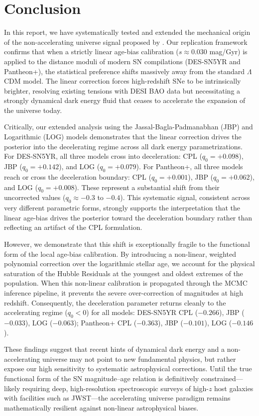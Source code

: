 \documentclass[12pt, a4paper]{article}
\begin{document}
\section{Conclusion}
In this report, we have systematically tested and extended the mechanical origin of the non-accelerating universe signal proposed by \citet{son2025}. Our replication framework confirms that when a strictly linear age-bias calibration ($s \approx 0.030$ mag/Gyr) is applied to the distance moduli of modern SN compilations (DES-SN5YR and Pantheon+), the statistical preference shifts massively away from the standard $\Lambda$CDM model. The linear correction forces high-redshift SNe to be intrinsically brighter, resolving existing tensions with DESI BAO data but necessitating a strongly dynamical dark energy fluid that ceases to accelerate the expansion of the universe today.

Critically, our extended analysis using the Jassal-Bagla-Padmanabhan (JBP) and Logarithmic (LOG) models demonstrates that the linear correction drives the posterior into the decelerating regime across all dark energy parametrizations. For DES-SN5YR, all three models cross into deceleration: CPL ($q_0 = +0.098$), JBP ($q_0 = +0.142$), and LOG ($q_0 = +0.079$). For Pantheon+, all three models reach or cross the deceleration boundary: CPL ($q_0 = +0.001$), JBP ($q_0 = +0.062$), and LOG ($q_0 = +0.008$). These represent a substantial shift from their uncorrected values ($q_0 \approx -0.3$ to $-0.4$). This systematic signal, consistent across very different parametric forms, strongly supports the interpretation that the linear age-bias drives the posterior toward the deceleration boundary rather than reflecting an artifact of the CPL formulation.

However, we demonstrate that this shift is exceptionally fragile to the functional form of the local age-bias calibration. By introducing a non-linear, weighted polynomial correction over the logarithmic stellar age, we account for the physical saturation of the Hubble Residuals at the youngest and oldest extremes of the population. When this non-linear calibration is propagated through the MCMC inference pipeline, it prevents the severe over-correction of magnitudes at high redshift. Consequently, the deceleration parameter returns cleanly to the accelerating regime ($q_0 < 0$) for all models: DES-SN5YR CPL ($-0.266$), JBP ($-0.033$), LOG ($-0.063$); Pantheon+ CPL ($-0.363$), JBP ($-0.101$), LOG ($-0.146$).

These findings suggest that recent hints of dynamical dark energy and a non-accelerating universe may not point to new fundamental physics, but rather expose our high sensitivity to systematic astrophysical corrections. Until the true functional form of the SN magnitude–age relation is definitively constrained—likely requiring deep, high-resolution spectroscopic surveys of high-$z$ host galaxies with facilities such as JWST—the accelerating universe paradigm remains mathematically resilient against non-linear astrophysical biases.
\end{document}
